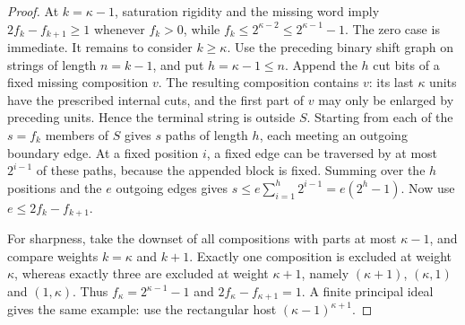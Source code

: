 \begin{proof}
At $k=\kappa-1$, saturation rigidity and the missing word imply
$2f_k-f_{k+1}\ge1$ whenever $f_k>0$, while
$f_k\le2^{\kappa-2}\le2^{\kappa-1}-1$. The zero case is immediate.
It remains to consider $k\ge\kappa$.
Use the preceding binary shift graph on strings of length $n=k-1$,
and put $h=\kappa-1\le n$. Append the $h$ cut bits of a fixed missing
composition $v$. The resulting composition contains $v$: its last
$\kappa$ units have the prescribed internal cuts, and the first part
of $v$ may only be enlarged by preceding units. Hence the terminal
string is outside $S$. Starting from each of the $s=f_k$ members of
$S$ gives $s$ paths of length $h$, each meeting an outgoing boundary
edge. At a fixed position $i$, a fixed edge can be traversed by at
most $2^{i-1}$ of these paths, because the appended block
is fixed. Summing over the $h$ positions and the
$e$ outgoing edges gives $s\le e\sum_{i=1}^h2^{i-1}=e(2^h-1)$. Now use
$e\le2f_k-f_{k+1}$.

For sharpness, take the downset of all compositions with parts at most
$\kappa-1$, and compare weights $k=\kappa$ and $k+1$.
Exactly one composition is excluded at weight $\kappa$, whereas
exactly three are excluded at weight $\kappa+1$, namely
$(\kappa+1)$, $(\kappa,1)$ and $(1,\kappa)$. Thus
$f_\kappa=2^{\kappa-1}-1$ and
$2f_\kappa-f_{\kappa+1}=1$. A finite principal ideal gives the same
example: use the rectangular host $(\kappa-1)^{\kappa+1}$.
\end{proof}
